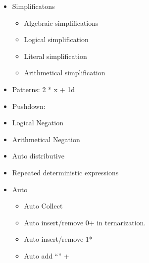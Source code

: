 \begin{itemize}
  \item Simplificatons
  \begin{itemize}
    \item Algebraic simplifications
    \item Logical simplification
    \item Literal simplification
    \item Arithmetical simplification
  \end{itemize}
  \item Patterns: 2 * x + 1d
  \item Pushdown:
   \item Logical Negation
  \item Arithmetical Negation
  \item Auto distributive
  \item Repeated deterministic expressions
  \item Auto
  \begin{itemize}
    \item Auto Collect
    \item Auto insert/remove 0+ in ternarization.
    \item Auto insert/remove 1*
    \item Auto add “” +
  \end{itemize}
\end{itemize}
